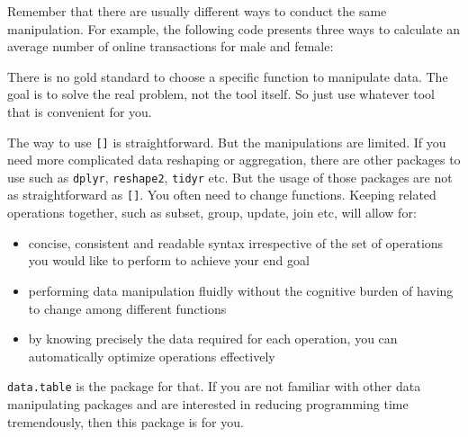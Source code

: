\documentclass[12pt,]{krantz}
\makeatletter
\newenvironment{Shaded}{\begin{snugshade}}{\end{snugshade}}
\newcommand{\DataTypeTok}[1]{\textcolor[rgb]{0.27,0.27,0.27}{#1}}
\newcommand{\KeywordTok}[1]{\textcolor[rgb]{0.27,0.27,0.27}{\textbf{#1}}}
\newcommand{\NormalTok}[1]{#1}
\newcommand{\OperatorTok}[1]{\textcolor[rgb]{0.43,0.43,0.43}{\textbf{#1}}}
\newcommand{\StringTok}[1]{\textcolor[rgb]{0.5,0.5,0.5}{#1}}
\providecommand{\tightlist}{%
  \setlength{\itemsep}{0pt}\setlength{\parskip}{0pt}}
\newenvironment{kframe}{%
\medskip{}
\setlength{\fboxsep}{.8em}
 \def\at@end@of@kframe{}%
 \ifinner\ifhmode%
  \def\at@end@of@kframe{\end{minipage}}%
  \begin{minipage}{\columnwidth}%
 \fi\fi%
 \def\FrameCommand##1{\hskip\@totalleftmargin \hskip-\fboxsep
 \colorbox{shadecolor}{##1}\hskip-\fboxsep
     \hskip-\linewidth \hskip-\@totalleftmargin \hskip\columnwidth}%
 \MakeFramed {\advance\hsize-\width
   \@totalleftmargin\z@ \linewidth\hsize
   \@setminipage}}%
 {\par\unskip\endMakeFramed%
 \at@end@of@kframe}
\renewenvironment{Shaded}{\begin{kframe}}{\end{kframe}}
\makeatother
\begin{document}
Remember that there are usually different ways to conduct the same manipulation. For example, the following code presents three ways to calculate an average number of online transactions for male and female:

\begin{Shaded}
\end{Shaded}

There is no gold standard to choose a specific function to manipulate data. The goal is to solve the real problem, not the tool itself. So just use whatever tool that is convenient for you.

The way to use \texttt{{[}{]}} is straightforward. But the manipulations are limited. If you need more complicated data reshaping or aggregation, there are other packages to use such as \texttt{dplyr}, \texttt{reshape2}, \texttt{tidyr} etc. But the usage of those packages are not as straightforward as \texttt{{[}{]}}. You often need to change functions. Keeping related operations together, such as subset, group, update, join etc, will allow for:

\begin{itemize}
\tightlist
\item
  concise, consistent and readable syntax irrespective of the set of operations you would like to perform to achieve your end goal
\item
  performing data manipulation fluidly without the cognitive burden of having to change among different functions
\item
  by knowing precisely the data required for each operation, you can automatically optimize operations effectively
\end{itemize}

\texttt{data.table} is the package for that. If you are not familiar with other data manipulating packages and are interested in reducing programming time tremendously, then this package is for you.
\end{document}
